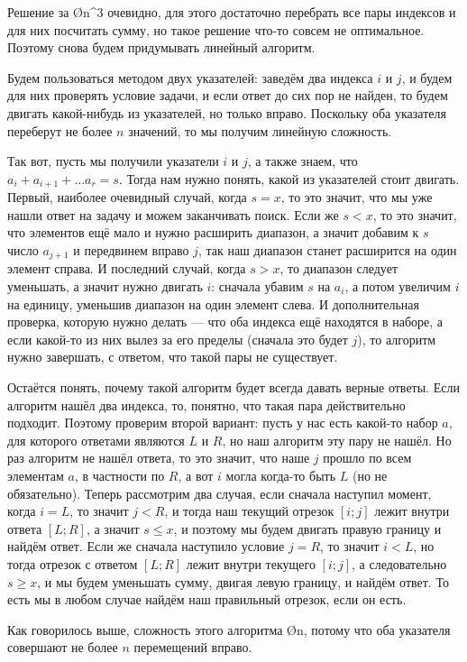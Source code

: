 Решение за \O{n^3} очевидно, для этого достаточно перебрать все пары индексов и для них посчитать сумму, но такое решение что-то совсем не оптимальное. Поэтому снова будем придумывать линейный алгоритм.

Будем пользоваться методом двух указателей: заведём два индекса $i$ и $j$, и будем для них проверять условие задачи, и если ответ до сих пор не найден, то будем двигать какой-нибудь из указателей, но только вправо. Поскольку оба указателя переберут не более $n$ значений, то мы получим линейную сложность.

Так вот, пусть мы получили указатели $i$ и $j$, а также знаем, что $a_i + a_{i + 1} + \ldots a_r = s$. Тогда нам нужно понять, какой из указателей стоит двигать. Первый, наиболее очевидный случай, когда $s = x$, то это значит, что мы уже нашли ответ на задачу и можем заканчивать поиск. Если же $s < x$, то это значит, что элементов ещё мало и нужно расширить диапазон, а значит добавим к $s$ число $a_{j + 1}$ и передвинем вправо $j$, так наш диапазон станет расширится на один элемент справа. И последний случай, когда $s > x$, то диапазон следует уменьшать, а значит нужно двигать $i$: сначала убавим $s$ на $a_i$, а потом увеличим $i$ на единицу, уменьшив диапазон на один элемент слева. И дополнительная проверка, которую нужно делать — что оба индекса ещё находятся в наборе, а если какой-то из них вылез за его пределы (сначала это будет $j$), то алгоритм нужно завершать, с ответом, что такой пары не существует.

Остаётся понять, почему такой алгоритм будет всегда давать верные ответы. Если алгоритм нашёл два индекса, то, понятно, что такая пара действительно подходит. Поэтому проверим второй вариант: пусть у нас есть какой-то набор $a$, для которого ответами являются $L$ и $R$, но наш алгоритм эту пару не нашёл. Но раз алгоритм не нашёл ответа, то это значит, что наше $j$ прошло по всем элементам $a$, в частности по $R$, а вот $i$ могла когда-то быть $L$ (но не обязательно). Теперь рассмотрим два случая, если сначала наступил момент, когда $i = L$, то значит $j < R$, и тогда наш текущий отрезок $[i; j]$ лежит внутри ответа $[L; R]$, а значит $s \leq x$, и поэтому мы будем двигать правую границу и найдём ответ. Если же сначала наступило условие $j = R$, то значит $i < L$, но тогда отрезок с ответом $[L; R]$ лежит внутри текущего $[i; j]$, а следовательно $s \geq x$, и мы будем уменьшать сумму, двигая левую границу, и найдём ответ. То есть мы в любом случае найдём наш правильный отрезок, если он есть.

Как говорилось выше, сложность этого алгоритма \O{n}, потому что оба указателя совершают не более $n$ перемещений вправо.
